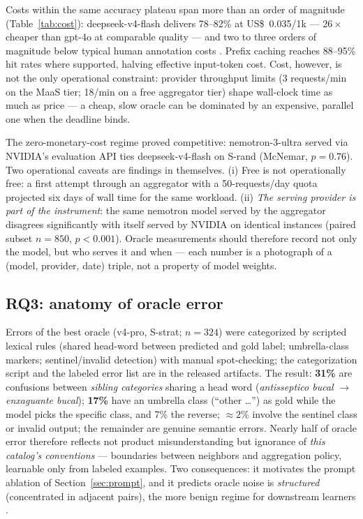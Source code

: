 \documentclass[11pt]{article}
\begin{document}
Costs within the same accuracy plateau span more than an order of
magnitude (Table~\ref{tab:cost}): deepseek-v4-flash delivers 78--82\% at
US\$~0.035/1k --- $26\times$ cheaper than gpt-4o at comparable quality ---
and two to three orders of magnitude below typical human annotation costs
\citep{Gilardi2023}. Prefix caching reaches 88--95\% hit rates where
supported, halving effective input-token cost. Cost, however, is not the
only operational constraint: provider throughput limits (3 requests/min on
the MaaS tier; 18/min on a free aggregator tier) shape wall-clock time as
much as price --- a cheap, slow oracle can be dominated by an expensive,
parallel one when the deadline binds.

The zero-monetary-cost regime proved competitive: nemotron-3-ultra served
via NVIDIA's evaluation API ties deepseek-v4-flash on S-rand (McNemar,
$p=0.76$). Two operational caveats are findings in themselves. (i) Free is
not operationally free: a first attempt through an aggregator with a
50-requests/day quota projected six days of wall time for the same
workload. (ii) \emph{The serving provider is part of the instrument}: the
same nemotron model served by the aggregator disagrees significantly with
itself served by NVIDIA on identical instances (paired subset $n=850$,
$p<0.001$). Oracle measurements should therefore record not only the
model, but who serves it and when --- each number is a photograph of a
(model, provider, date) triple, not a property of model weights.

\subsection{RQ3: anatomy of oracle error}

Errors of the best oracle (v4-pro, S-strat; $n=324$) were categorized by
scripted lexical rules (shared head-word between predicted and gold label;
umbrella-class markers; sentinel/invalid detection) with manual
spot-checking; the categorization script and the labeled error list are in
the released artifacts. The result: \textbf{31\%}
are confusions between \emph{sibling categories} sharing a head word
(\textit{antisseptico bucal} $\to$ \textit{enxaguante bucal});
\textbf{17\%} have an umbrella class (``other \ldots'') as gold while the
model picks the specific class, and 7\% the reverse; $\approx 2\%$ involve
the sentinel class or invalid output; the remainder are genuine semantic
errors. Nearly half of oracle error therefore reflects not product
misunderstanding but ignorance of \emph{this catalog's conventions} ---
boundaries between neighbors and aggregation policy, learnable only from
labeled examples. Two consequences: it motivates the prompt ablation of
Section~\ref{sec:prompt}, and it predicts oracle noise is
\emph{structured} (concentrated in adjacent pairs), the more benign regime
for downstream learners \citep{Frenay2014,Song2023NoisyLabels}.
\end{document}
